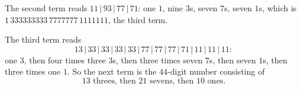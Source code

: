 The second term reads $11\,|\,93\,|\,77\,|\,71$: one $1$, nine $3$s, seven $7$s, seven $1$s, which is $1\,333333333\,7777777\,1111111$, the third term.

The third term reads
\[13\,|\,33\,|\,33\,|\,33\,|\,33\,|\,77\,|\,77\,|\,77\,|\,71\,|\,11\,|\,11\,|\,11:\]
one $3$, then four times three $3$s, then three times seven $7$s, then seven $1$s, then three times one $1$. So the next term is the $44$-digit number consisting of
\[\boxed{13\text{ threes, then }21\text{ sevens, then }10\text{ ones}}.\]
